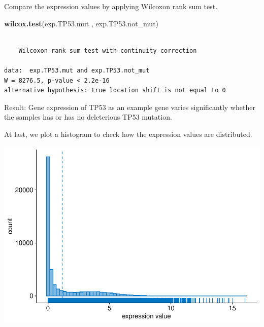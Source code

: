 \documentclass[]{article}
\newenvironment{Shaded}{\begin{snugshade}}{\end{snugshade}}
\newcommand{\KeywordTok}[1]{\textcolor[rgb]{0.13,0.29,0.53}{\textbf{#1}}}
\newcommand{\DataTypeTok}[1]{\textcolor[rgb]{0.13,0.29,0.53}{#1}}
\newcommand{\DecValTok}[1]{\textcolor[rgb]{0.00,0.00,0.81}{#1}}
\newcommand{\StringTok}[1]{\textcolor[rgb]{0.31,0.60,0.02}{#1}}
\newcommand{\OtherTok}[1]{\textcolor[rgb]{0.56,0.35,0.01}{#1}}
\newcommand{\NormalTok}[1]{#1}
\begin{document}
Compare the expression values by applying Wilcoxon rank sum test.

\begin{Shaded}
\begin{Highlighting}[]
\KeywordTok{wilcox.test}\NormalTok{(exp.TP53.mut , exp.TP53.not_mut)}
\end{Highlighting}
\end{Shaded}

\begin{verbatim}

    Wilcoxon rank sum test with continuity correction

data:  exp.TP53.mut and exp.TP53.not_mut
W = 8276.5, p-value < 2.2e-16
alternative hypothesis: true location shift is not equal to 0
\end{verbatim}

Result: Gene expression of TP53 as an example gene varies significantly
whether the samples has or has no deleterious TP53 mutation.

At last, we plot a histogram to check how the expression values are
distributed.

\begin{Shaded}
\end{Shaded}

\includegraphics{Project_HNC_files/figure-latex/1_expression_values7-1.pdf}
\end{document}

